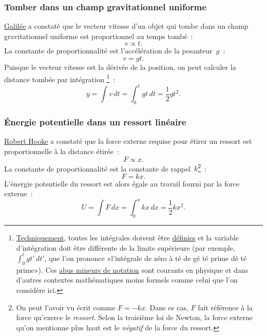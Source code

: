     \subsubsection{Tomber dans un champ gravitationnel uniforme} %
    \label{sec:falling_in_a_uniform_gravitational_field}

\href{https://fr.wikipedia.org/wiki/Galil%C3%A9e_(savant)}{Galilée} a constaté
que le vecteur vitesse d'un objet qui tombe dans un champ gravitationnel
uniforme est proportionnel au temps tombé~:
\[ v \propto t. \]
La constante de proportionnalité est l'accélération de la pesanteur~$g$~:
\[ v = g t. \]
Puisque le vecteur vitesse est la dérivée de la position, on peut calculer la
distance tombée par
intégration\ns
\footnote{\href{https://translate.google.com/translate?hl=en&sl=en&tl=fr&u=https://www.explainxkcd.com/wiki/index.php/1475:_Technically}{Techniquement},
toutes les intégrales doivent être
\href{https://translate.google.com/#view=home&op=translate&sl=en&tl=fr&text=https://mathworld.wolfram.com/DefiniteIntegral.html}{définies}
et la variable d'intégration doit être
différente de la limite supérieure (par exemple, $\int_{0}^{t} gt'\, dt'$, que
l'on prononce «\ns l'intégrale de zéro à té de gé té prime dé té prime\ns »). Ces
\href{https://fr.wikipedia.org/wiki/Abus_de_notation}{abus mineurs de notation}
sont courants en physique et dans d'autres contextes mathématiques moins formels
comme celui que l'on considère ici.}~:
\[ y = \int v\,dt = \int_0^t gt\,dt = \textstyle{\frac{1}{2}} gt^2. \]


    \subsubsection{Énergie potentielle dans un ressort linéaire} %
    \label{sec:potential_energy_in_a_linear_spring}

\href{https://fr.wikipedia.org/wiki/Robert_Hooke}{Robert Hooke} a constaté que
la force externe requise pour étirer un ressort est proportionnelle à la
distance étirée~:
\[ F \propto x. \]
La constante de proportionnalité est la constante de rappel~$k$\ns\footnote{On
peut l'avoir vu écrit comme $F=-kx$. Dans ce cas, $F$ fait référence à la
force qu'exerce le \emph{ressort}. Selon la troisième loi de Newton, la force
externe qu'on mentionne plus haut est le \emph{négatif} de la force du ressort.}~:
\[ F = k x. \]
L'énergie potentielle du ressort est alors égale au travail fourni par la force
externe~:
\[ U = \int F\,dx = \int_0^x kx\,dx = \textstyle{\frac{1}{2}} kx^2. \]

